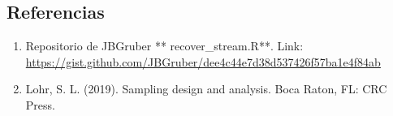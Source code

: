 \documentclass[
]{article}
\providecommand{\tightlist}{%
  \setlength{\itemsep}{0pt}\setlength{\parskip}{0pt}}
\begin{document}
\hypertarget{referencias}{%
\subsection{Referencias}\label{referencias}}

\begin{enumerate}
\def\labelenumi{\arabic{enumi}.}
\tightlist
\item
  Repositorio de JBGruber ** recover\_stream.R**. Link:
  \url{https://gist.github.com/JBGruber/dee4c44e7d38d537426f57ba1e4f84ab}
\item
  Lohr, S. L. (2019). Sampling design and analysis. Boca Raton, FL: CRC
  Press.
\end{enumerate}
\end{document}
